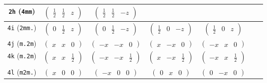 \documentclass[fleqn,9pt,landscape]{jsarticle}
\begin{document}
\begin{center}
\begin{longtable}{ccccccc}
{\tt 2h} ({\tt 4mm}) & $ \begin{pmatrix} \frac{1}{2} & \frac{1}{2} & z \end{pmatrix} $ & $ \begin{pmatrix} \frac{1}{2} & \frac{1}{2} & - z \end{pmatrix} $ & $  $ & $  $ & $  $ & $  $ \\ \hline
{\tt 4i} ({\tt 2mm.}) & $ \begin{pmatrix} 0 & \frac{1}{2} & z \end{pmatrix} $ & $ \begin{pmatrix} 0 & \frac{1}{2} & - z \end{pmatrix} $ & $ \begin{pmatrix} \frac{1}{2} & 0 & - z \end{pmatrix} $ & $ \begin{pmatrix} \frac{1}{2} & 0 & z \end{pmatrix} $ & $  $ & $  $ \\ \hline
{\tt 4j} ({\tt m.2m}) & $ \begin{pmatrix} x & x & 0 \end{pmatrix} $ & $ \begin{pmatrix} - x & - x & 0 \end{pmatrix} $ & $ \begin{pmatrix} x & - x & 0 \end{pmatrix} $ & $ \begin{pmatrix} - x & x & 0 \end{pmatrix} $ & $  $ & $  $ \\ \hline
{\tt 4k} ({\tt m.2m}) & $ \begin{pmatrix} x & x & \frac{1}{2} \end{pmatrix} $ & $ \begin{pmatrix} - x & - x & \frac{1}{2} \end{pmatrix} $ & $ \begin{pmatrix} x & - x & \frac{1}{2} \end{pmatrix} $ & $ \begin{pmatrix} - x & x & \frac{1}{2} \end{pmatrix} $ & $  $ & $  $ \\ \hline
{\tt 4l} ({\tt m2m.}) & $ \begin{pmatrix} x & 0 & 0 \end{pmatrix} $ & $ \begin{pmatrix} - x & 0 & 0 \end{pmatrix} $ & $ \begin{pmatrix} 0 & x & 0 \end{pmatrix} $ & $ \begin{pmatrix} 0 & - x & 0 \end{pmatrix} $ & $  $ & $  $ \\ \hline

\end{longtable}
\end{center}
\end{document}
